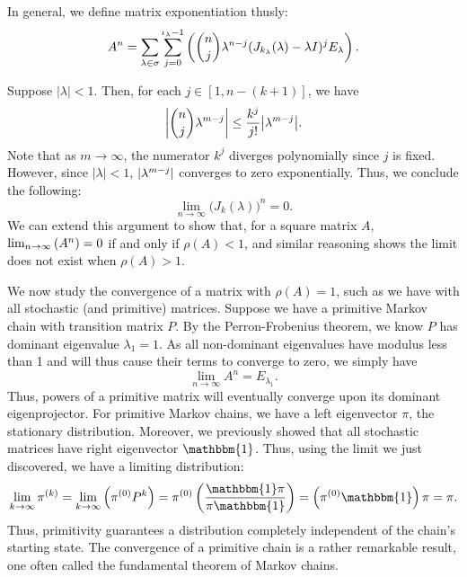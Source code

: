 \documentclass[../exploring-pagerank.tex]{subfiles}
\begin{document}
    In general, we define matrix exponentiation thusly:
        \begin{equation}
        A^n = \sum_{\lambda \in \sigma}\sum_{j=0}^{\iota_{\lambda} - 1}\parens{ \binom{n}{j} \lambda^{n-j} (J_{k_\lambda}(\lambda) - \lambda I)^j E_{\lambda} }.
    \end{equation}
    
    Suppose $| \lambda | < 1$. Then, for each $j \in [1, n-(k+1)]$, we have
    \begin{equation*}
        \abs*{\binom{n}{j}\lambda^{m-j}} \leq \frac{k^j}{j!}{\abs*{\lambda^{m-j}}}.
    \end{equation*}
    Note that as $m \to \infty$, the numerator $k^j$ diverges polynomially since $j$ is fixed. However, since $| \lambda | < 1$, $\abs{\lambda^{m-j}}$ converges to zero exponentially. Thus, we conclude the following:
    \begin{equation*}
        \lim_{n\to\infty}{\big( J_k(\lambda) \big)^n} = 0.
    \end{equation*}
    We can extend this argument to show that, for a square matrix $A$, $\lim_{n\to\infty}{\parens{A^n}} = 0$ if and only if $\rho(A) < 1$, and similar reasoning shows the limit does not exist when $\rho(A) > 1$.
    
    We now study the convergence of a matrix with $\rho(A) = 1$, such as we have with all stochastic (and primitive) matrices. Suppose we have a primitive Markov chain with transition matrix $P$. By the Perron-Frobenius theorem, we know $P$ has dominant eigenvalue $\lambda_1 = 1$. As all non-dominant eigenvalues have modulus less than 1 and will thus cause their terms to converge to zero, we simply have
    \begin{equation*}
        \lim_{n\to\infty}{A^n} = E_{\lambda_1}.
    \end{equation*}
    Thus, powers of a primitive matrix will eventually converge upon its dominant eigenprojector. For primitive Markov chains, we have a left eigenvector $\pi$, the stationary distribution. Moreover, we previously showed that all stochastic matrices have right eigenvector $\mathbbm{1}$. Thus, using the limit we just discovered, we have a limiting distribution:
    \begin{equation}
        \lim_{k\to\infty}{{\iterate{\pi}{k}}} = \lim_{k\to\infty}{\parens{{\iterate{\pi}{0}} P^k}} = \iterate{\pi}{0} \parens{\frac{\mathbbm{1} \pi}{\pi \mathbbm{1}}} = \parens{\iterate{\pi}{0} \mathbbm{1}} \pi = \pi. 
    \end{equation}
    Thus, primitivity guarantees a distribution completely independent of the chain's starting state. The convergence of a primitive chain is a rather remarkable result, one often called the fundamental theorem of Markov chains.
    
\end{document}
